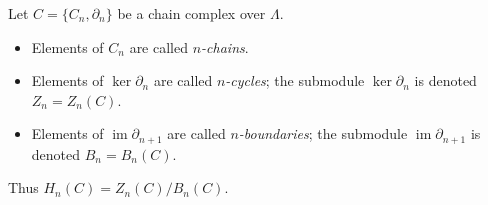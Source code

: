 Let $C = \{C_n, \partial_n\}$ be a chain complex over $\Lambda$.

\begin{itemize}
\item Elements of $C_n$ are called \textit{$n$-chains}.
\item Elements of $\ker \partial_n$ are called \textit{$n$-cycles}; the submodule $\ker \partial_n$ is denoted $Z_n = Z_n(C)$.
\item Elements of $\operatorname{im} \partial_{n+1}$ are called \textit{$n$-boundaries}; the submodule $\operatorname{im} \partial_{n+1}$ is denoted $B_n = B_n(C)$.
\end{itemize}

Thus $H_n(C) = Z_n(C) / B_n(C)$.
